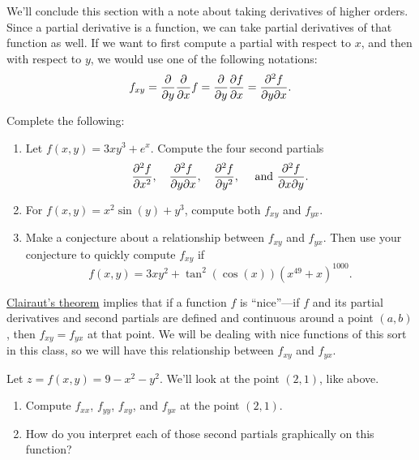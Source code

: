 We'll conclude this section with a note about taking derivatives of higher orders.  Since a partial derivative is a function, we can take partial derivatives of that function as well.  If we want to first compute a partial with respect to $x$, and then with respect to $y$, we would use one of the following notations: $$f_{xy}=\displaystyle\frac{\partial}{\partial y}\frac{\partial}{\partial x}f = \frac{\partial}{\partial y}\frac{\partial f}{\partial x} = \frac{\partial^2 f}{\partial y \partial x}.$$

\begin{problem}\label{second partials agree}%
Complete the following:
\begin{enumerate}
 \item Let $f(x,y)=3xy^3+e^{x}.$
Compute the four second partials $$\displaystyle \frac{\partial^2 f}{ \partial x^2},\quad \displaystyle\frac{\partial^2 f}{\partial y \partial x},\quad \displaystyle\frac{\partial^2 f}{\partial y^2}, \quad \text{ and }\displaystyle\frac{\partial^2 f}{\partial x \partial y}.$$
 \item For $f(x,y)=x^2\sin(y)+y^3$, compute both $f_{xy}$ and $f_{yx}$.  
 \item Make a conjecture about a relationship between $f_{xy}$ and $f_{yx}$. Then use your conjecture to quickly compute $f_{xy}$ if $$f(x,y)=3xy^2+\tan^{2}(\cos(x)) (x^{49}+x)^{1000}.$$
\end{enumerate}
\end{problem}

\href{http://en.wikipedia.org/wiki/Symmetry_of_second_derivatives#Clairaut.27s_theorem}{Clairaut's theorem} implies that if a function $f$ is ``nice''---if $f$ and its partial derivatives and second partials are defined and continuous around a point $(a,b)$, then $f_{xy}=f_{yx}$ at that point.  We will be dealing with nice functions of this sort in this class, so we will have this relationship between $f_{xy}$ and $f_{yx}$.

\begin{problem}
  Let $z=f(x,y)=9-x^2-y^2$.  We'll look at the point $(2,1)$, like above.
  \begin{enumerate}
  \item Compute $f_{xx}$, $f_{yy}$, $f_{xy}$, and $f_{yx}$ at the point $(2,1)$.
  \item How do you interpret each of those second partials graphically on this function?
  \end{enumerate}
\end{problem}


